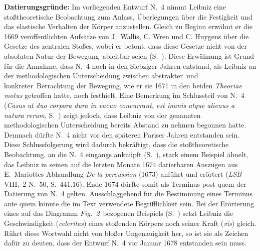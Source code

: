 \begin{ledgroup}
\footnotesize 
\pstart
\noindent\textbf{Datierungsgründe:}
Im vorliegenden Entwurf N.~4 %
nimmt Leibniz eine stoßtheoretische Beobachtung zum Anlass, Überlegungen über die Festigkeit und das elastische Verhalten der Körper anzustellen.
Gleich zu Beginn erwähnt er die 1669 veröffentlichten Aufsätze von J.~Wallis, C. Wren und C. Huygens über die Gesetze des zentralen Stoßes, wobei er betont, dass diese Gesetze nicht von der \glqq absoluten Natur der Bewegung\grqq\ ableitbar seien (S.~).%
\protect{}%
\protect{}%
\protect{}
Diese Erwähnung ist Grund für die Annahme, dass N.~4 noch in den Siebziger Jahren entstand, als Leibniz an der methodologischen Unterscheidung zwischen \glqq abstrakter\grqq\ und \glqq konkreter\grqq\ Betrachtung der Bewegung, wie er sie 1671 in den beiden \textit{Theoriae motus} getroffen hatte, noch festhielt.
Eine Bemerkung im Schlussteil von N.~4 (\textit{Casus ut duo corpora dura in vacuo concurrant, est inanis atque alienus a natura rerum}, S.~) zeigt jedoch, dass Leibniz von der genannten methodologischen Unterscheidung bereits Abstand zu nehmen begonnen hatte.
Demnach dürfte N.~4 nicht vor den späteren Pariser\protect{} Jahren entstanden sein.
Diese Schlussfolgerung wird dadurch bekräftigt, dass die stoßtheoretische Beobachtung, an die N.~4 eingangs anknüpft (S.~), stark einem Beispiel ähnelt, das Leibniz in seinen auf die letzten Monate 1674 datierbaren Auszügen aus E.~Mariottes Abhandlung \textit{De la percussion}\cite{00311} (1673) 
anführt und erörtert (\textit{LSB} VIII,~2 N.~50, S.~441.16).\cite{01292}%
\protect{}
Ende 1674 dürfte somit als Terminus post quem der Datierung von N.~4 gelten.
\pend%
\pstart%
Ausschlaggebend für die Bestimmung eines Terminus ante quem könnte die im Text verwendete Begrifflichkeit sein.
Bei der Erörterung eines auf das Diagramm \lbrack\textit{Fig.~2}\rbrack\ bezogenen Beispiels (S.~) setzt Leibniz die Geschwindigkeit (\textit{celeritas}) eines stoßenden Körpers noch seiner Kraft (\textit{vis}) gleich.
Rührt diese Wortwahl nicht von bloßer Ungenauigkeit her, so ist sie als Zeichen dafür zu deuten, dass der Entwurf N.~4 vor Januar 1678 entstanden sein muss.
\pend 
\end{ledgroup}
